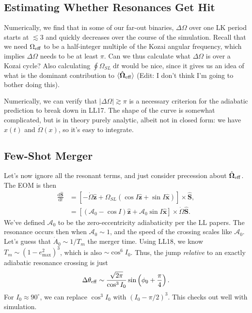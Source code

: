 \documentclass[11pt,
        usenames, %
        dvipsnames %
    ]{article}
\newcommand*{\rd}[2]{\frac{\mathrm{d}#1}{\mathrm{d}#2}}
\newcommand*{\bm}[1]{\boldsymbol{\mathbf{#1}}}
\newcommand*{\uv}[1]{\hat{\bm{#1}}}
\newcommand*{\abs}[1]{\left|#1\right|}
\newcommand*{\ev}[1]{\langle#1\rangle}
\newcommand*{\p}[1]{\left(#1\right)}
\newcommand*{\s}[1]{\left[#1\right]}
\begin{document}
\subsection{Estimating Whether Resonances Get Hit}

Numerically, we find that in some of our far-out binaries, $\Delta \Omega$ over
one LK period starts at $\lesssim 3$ and quickly decreases over the course of
the simulation. Recall that we need $\Omega_{\rm eff}$ to be a half-integer
multiple of the Kozai angular frequency, which implies $\Delta \Omega$ needs to
be at least $\pi$. Can we thus calculate what $\Delta \Omega$ is over a Kozai
cycle? Also calculating $\oint \Omega_{SL}\;\mathrm{d}t$ would be nice, since it
gives us an idea of what is the dominant contribution to $\ev{\uv{\Omega}_{\rm
eff}}$ (Edit: I don't think I'm going to bother doing this).

Numerically, we can verify that $\abs{\Delta \Omega} \gtrsim \pi$ is a necessary
criterion for the adiabatic prediction to break down in LL17. The shape of the
curve is somewhat complicated, but is in theory purely analytic, albeit not in
closed form: we have $x(t)$ and $\dot{\Omega}(x)$, so it's easy to integrate.

\subsection{Few-Shot Merger}

Let's now ignore all the resonant terms, and just consider precession about
$\uv{\Omega}_{\rm eff}$. The EOM is then
\begin{align}
    \rd{\uv{S}}{t} &= \s{-\dot{\Omega}\uv{z} + \Omega_{SL}\p{\cos I \uv{z} +
        \sin I \uv{x}}} \times \uv{S},\\
        &= \s{\p{\mathcal{A}_0 - \cos I}\uv{z} + \mathcal{A}_0\sin I \uv{x}}
            \times \dot{\Omega} \uv{S}.
\end{align}
We've defined $\mathcal{A}_0$ to be the zero-eccentricity adiabaticity per the
LL papers. The resonance occurs then when $\mathcal{A}_0 \sim 1$, and the speed
of the crossing scales like $\mathcal{A}_0$. Let's guess that $\dot{A}_0 \sim
1/T_m$ the merger time. Using LL18, we know $T_m \sim \p{1 - e_{\max}^2}^3$,
which is also $\sim \cos^6 I_0$. Thus, the jump \emph{relative} to an exactly
adiabatic resonance crossing is just
\begin{equation}
    \Delta \theta_{\rm eff} \sim \frac{\sqrt{2\pi}}{\cos^3 I_0}
        \sin\p{\phi_0 + \frac{\pi}{4}}.
\end{equation}
For $I_0 \approx 90^\circ$, we can replace $\cos^3 I_0$ with $\p{I_0 -
\pi/2}^3$. This checks out well with simulation.
\end{document}
